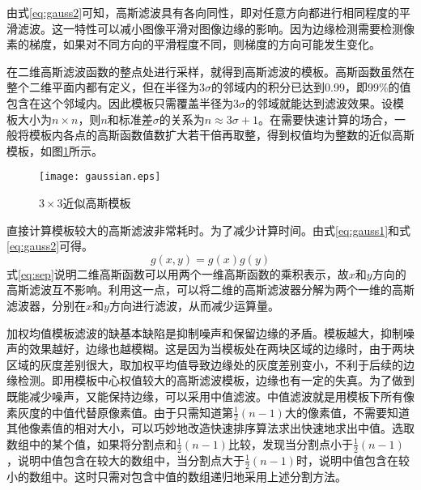 由式\eqref{eq:gauss2}可知，高斯滤波具有各向同性，即对任意方向都进行相同程度的平滑滤波。这一特性可以减小图像平滑对图像边缘的影响。因为边缘检测需要检测像素的梯度，如果对不同方向的平滑程度不同，则梯度的方向可能发生变化。

在二维高斯滤波函数的整点处进行采样，就得到高斯滤波的模板。高斯函数虽然在整个二维平面内都有定义，但在半径为$3\sigma$的邻域内的积分已达到0.99，即99\%的值包含在这个邻域内。因此模板只需覆盖半径为$3\sigma$的邻域就能达到滤波效果。设模板大小为$n\times n$，则$n$和标准差$\sigma$的关系为$n\approx 3\sigma+1$。在需要快速计算的场合，一般将模板内各点的高斯函数值数扩大若干倍再取整，得到权值均为整数的近似高斯模板，如图\ref{fig:gaussian}所示。
\begin{figure}[!h]
  \centering
  \texttt{[image: gaussian.eps]}
  \caption{$3\times 3$近似高斯模板}
  \label{fig:gaussian}
\end{figure}

直接计算模板较大的高斯滤波非常耗时。为了减少计算时间。由式\eqref{eq:gauss1}和式\eqref{eq:gauss2}可得。
\begin{equation}
  \label{eq:sep}
  g(x,y)=g(x)g(y)
\end{equation}
式\eqref{eq:sep}说明二维高斯函数可以用两个一维高斯函数的乘积表示，故$x$和$y$方向的高斯滤波互不影响。利用这一点，可以将二维的高斯滤波器分解为两个一维的高斯滤波器，分别在$x$和$y$方向进行滤波，从而减少运算量。


加权均值模板滤波的缺基本缺陷是抑制噪声和保留边缘的矛盾。模板越大，抑制噪声的效果越好，边缘也越模糊。这是因为当模板处在两块区域的边缘时，由于两块区域的灰度差别很大，取加权平均值导致边缘处的灰度差别变小，不利于后续的边缘检测。即用模板中心权值较大的高斯滤波模板，边缘也有一定的失真。为了做到既能减少噪声，又能保持边缘，可以采用中值滤波。中值滤波就是用模板下所有像素灰度的中值代替原像素值。由于只需知道第$\frac{1}{2}(n-1)$大的像素值，不需要知道其他像素值的相对大小，可以巧妙地改造快速排序算法求出快速地求出中值。选取数组中的某个值，如果将分割点和$\frac{1}{2}(n-1)$比较，发现当分割点小于$\frac{1}{2}(n-1)$，说明中值包含在较大的数组中，当分割点大于$\frac{1}{2}(n-1)$时，说明中值包含在较小的数组中。这时只需对包含中值的数组递归地采用上述分割方法。

